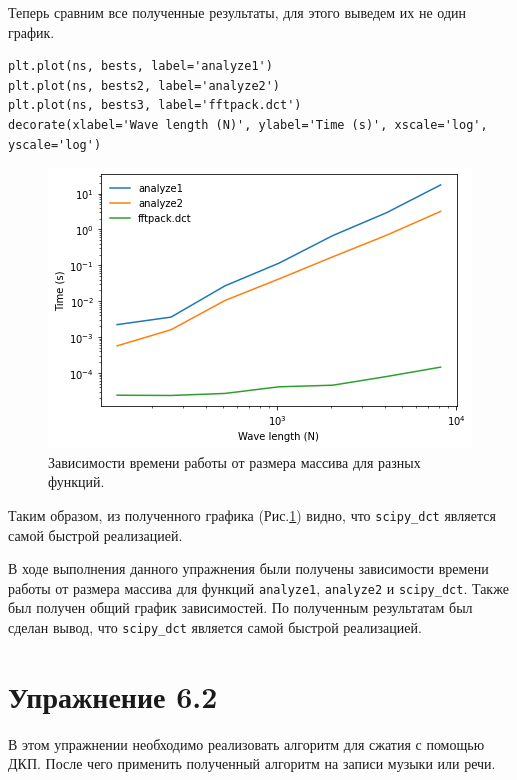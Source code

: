\documentclass[a4paper, 14pt]{extarticle}
\begin{document}
    Теперь сравним все полученные результаты, для этого выведем их не один график.

    \begin{lstlisting}[caption= Сравнение полученных результатов., label={lst:task1_test_all}]
plt.plot(ns, bests, label='analyze1')
plt.plot(ns, bests2, label='analyze2')
plt.plot(ns, bests3, label='fftpack.dct')
decorate(xlabel='Wave length (N)', ylabel='Time (s)', xscale='log', yscale='log')   \end{lstlisting}

    \begin{figure}[h]
        \centering
        \includegraphics[width=0.7\linewidth]{resources/Images/task1_test_all}
        \caption{Зависимости времени работы от размера массива для разных функций.}
        \label{fig:task1_test_all}
    \end{figure}

    Таким образом, из полученного графика (Рис.\ref{fig:task1_test_all}) видно, что \texttt{scipy\_dct} является самой
    быстрой реализацией.

    В ходе выполнения данного упражнения были получены зависимости времени работы от размера массива для функций
    \texttt{analyze1}, \texttt{analyze2} и \texttt{scipy\_dct}. Также был получен общий график зависимостей. По полученным
    результатам был сделан вывод, что \texttt{scipy\_dct} является самой быстрой реализацией.

    \newpage

    \section{Упражнение 6.2}
    \label{sec:task2}

    В этом упражнении необходимо реализовать алгоритм для сжатия с помощью ДКП. После чего применить полученный алгоритм
    на записи музыки или речи.
\end{document}
